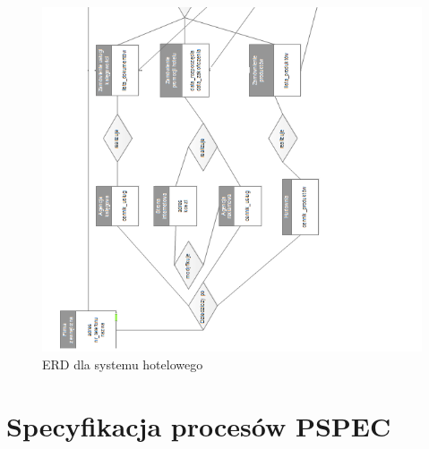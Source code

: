 \documentclass[a4paper, 11pt]{article}
\begin{document}
	\begin{figure}[H]%
		\includegraphics[scale=1.0]{Img/ERD2.png}
		\caption{ERD dla systemu hotelowego}
	\end{figure}
	
	
	
	
	\newpage
	\section{Specyfikacja procesów PSPEC}
\end{document}

